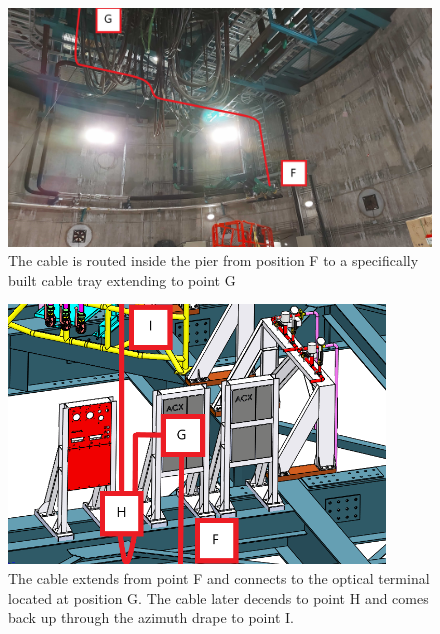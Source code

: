   \begin{figure}
    \centering
    \includegraphics[width=15cm]{images/19-1.jpg}
    \caption*{The cable is routed inside the pier from position F to a specifically built cable tray extending to point G}
  \end{figure}
  \begin{figure}
    \centering
    \includegraphics[width=10cm]{images/21-1.png}
    \caption*{The cable extends from point F and connects to the optical terminal located at position G. The cable later decends to point H and comes back up through the azimuth drape to point I.}
  \end{figure}

\newpage

